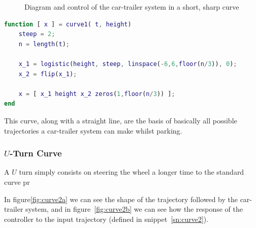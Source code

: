 \begin{figure}[H]
	\centering
	\hspace{0.5cm}%
	\caption{Diagram and control of the car-trailer system in a short, sharp curve}
\end{figure}

\begin{lstlisting}[language=matlab, label=sn:curve1b, caption=Function used to simulate a standard curve]
function [ x ] = curve1( t, height)
    steep = 2;
    n = length(t);

    x_1 = logistic(height, steep, linspace(-6,6,floor(n/3)), 0);
    x_2 = flip(x_1);

    x = [ x_1 height x_2 zeros(1,floor(n/3)) ];
end
\end{lstlisting}

This curve, along with a straight line, are the basis of basically all possible trajectories a car-trailer system can make whilst parking.

\subsubsection*{$U$-Turn Curve}
A $U$ turn simply consists on steering the wheel a longer time to the standard curve pr

In figure\ref{fig:curve2a} we can see the shape of the trajectory followed by the car-trailer system, and in figure~\ref{fig:curve2b} we can see how the response of the controller to the input trajectory (defined in snippet~\ref{sn:curve2}).


